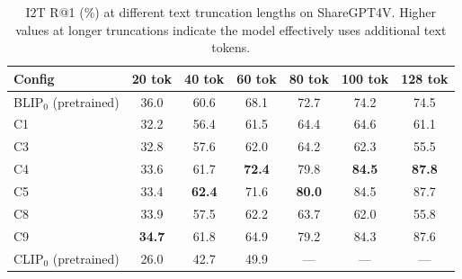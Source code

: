 \begin{table}[t]
\centering
\caption{I2T R@1 (\%) at different text truncation lengths on ShareGPT4V. Higher values at longer truncations indicate the model effectively uses additional text tokens.}
\label{tab:truncation_sharegpt4v}
\small
\setlength{\tabcolsep}{5pt}
\begin{tabular}{lcccccc}
\toprule
\textbf{Config} & 20 tok & 40 tok & 60 tok & 80 tok & 100 tok & 128 tok \\
\midrule
BLIP$_0$ (pretrained) & 36.0 & 60.6 & 68.1 & 72.7 & 74.2 & 74.5 \\
\midrule
C1 & 32.2 & 56.4 & 61.5 & 64.4 & 64.6 & 61.1 \\
C3 & 32.8 & 57.6 & 62.0 & 64.2 & 62.3 & 55.5 \\
C4 & 33.6 & 61.7 & \textbf{72.4} & 79.8 & \textbf{84.5} & \textbf{87.8} \\
C5 & 33.4 & \textbf{62.4} & 71.6 & \textbf{80.0} & 84.5 & 87.7 \\
C8 & 33.9 & 57.5 & 62.2 & 63.7 & 62.0 & 55.8 \\
C9 & \textbf{34.7} & 61.8 & 64.9 & 79.2 & 84.3 & 87.6 \\
CLIP$_0$ (pretrained) & 26.0 & 42.7 & 49.9 & --- & --- & --- \\
\bottomrule
\end{tabular}
\end{table}
